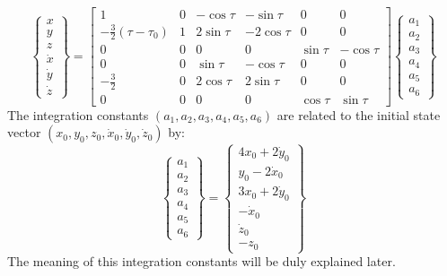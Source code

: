 		\begin{equation}
		\left\{
		\begin{array}{c}
		x\\
		y\\
		z\\
		\dot{x}\\
		\dot{y}\\
		\dot{z}
		\end{array}\right\}
		= 
		\left[ \begin{array}{cccccc}
		1 								& 0	& -\cos\tau & -\sin\tau 	& 0 		& 0 \\
		-\frac{3}{2}(\tau - \tau_0) 	& 1 & 2\sin\tau & -2\cos\tau 	& 0 		& 0\\
		0 								& 0 & 0 		& 0 			& \sin\tau 	& -\cos\tau \\
		0 								& 0 & \sin\tau 	& -\cos\tau 	& 0 		& 0\\
		-\frac{3}{2}					& 0 & 2\cos\tau & 2\sin \tau 	& 0 		& 0\\
		0 								& 0 & 0 		& 0 			& \cos\tau 	& \sin \tau
		\end{array}\right]
		\left\{
		\begin{array}{c}
		a_1\\
		a_2\\
		a_3\\
		a_4\\
		a_5\\
		a_6
		\end{array}\right\}
		\label{eqCh5:Hill_eqs_RTN_V2}
		\end{equation}
		\indent The integration constants $(a_1, a_2, a_3, a_4, a_5, a_6)$ are related to the initial state vector $(x_0, y_0, z_0, \dot{x}_0, \dot{y}_0, \dot{z}_0 )$ by:
		\begin{equation}
		\left\{
		\begin{array}{c}
		a_1\\
		a_2\\
		a_3\\
		a_4\\
		a_5\\
		a_6
		\end{array}\right\} = 
		\left\{
		\begin{array}{c}
		4x_0 + 2 \dot{y}_0\\
		y_0 - 2\dot{x}_0\\
		3 x_0 + 2 \dot{y}_0\\
		-\dot{x}_0\\
		\dot{z}_0\\
		-z_0
		\end{array}\right\}
		\label{eqCh5:a_i}
		\end{equation}
		\indent The meaning of this integration constants will be duly explained later.
